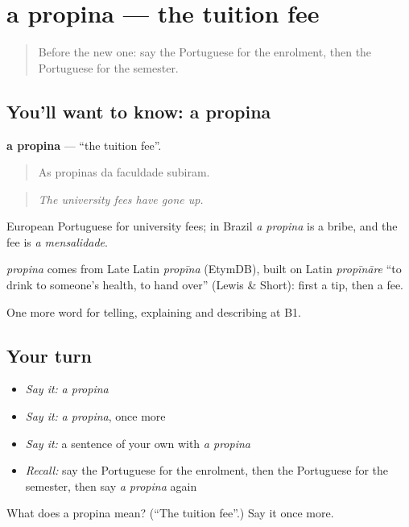 \section[a propina]{a propina — the tuition fee}

\label{lesson:PT-C376-propina}



\begin{quote}
Before the new one: say the Portuguese for the enrolment, then the Portuguese for the semester.
\end{quote}

\subsection*{You'll want to know: a propina}
\textbf{a propina} — \textquotedblleft{}the tuition fee\textquotedblright{}.

\begin{quote}
As propinas da faculdade subiram.
\end{quote}

\begin{quote}
\emph{The university fees have gone up.}
\end{quote}

European Portuguese for university fees; in Brazil \emph{a propina} is a bribe, and the fee is \emph{a mensalidade}.

\begin{cousinweb}
\emph{propina} comes from Late Latin \emph{propīna} (EtymDB), built on Latin \emph{propīnāre} \textquotedblleft{}to drink to someone's health, to hand over\textquotedblright{} (Lewis \& Short): first a tip, then a fee.
\end{cousinweb}

\begin{grammarlens}[title={What you've built}]
One more word for telling, explaining and describing at B1.
\end{grammarlens}

\subsection*{Your turn}
\begin{itemize}
\raggedright
  \item \emph{Say it:} \emph{a propina}
  \item \emph{Say it:} \emph{a propina}, once more
  \item \emph{Say it:} a sentence of your own with \emph{a propina}
  \item \emph{Recall:} say the Portuguese for the enrolment, then the Portuguese for the semester, then say \emph{a propina} again
\end{itemize}

\begin{tcolorbox}[breakable,colback=teal!4,colframe=teal!35!black,title={Before you move on}]
What does a propina mean? (\textquotedblleft{}The tuition fee\textquotedblright{}.) Say it once more.
\end{tcolorbox}
